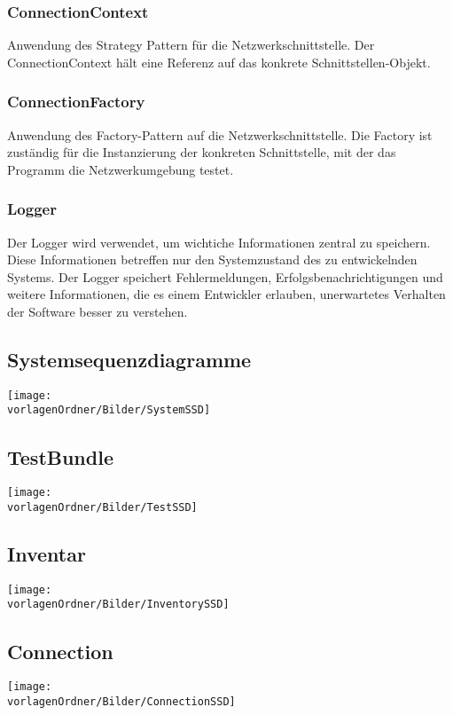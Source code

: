 \documentclass[
	ngerman,
	toc=listof, %
	toc=bibliography, %
	footnotes=multiple, %
	parskip=half, %
	numbers=noendperiod %
]{scrartcl}
\newcommand{\vorlagenOrdner}{../../99_Vorlagen} %
\begin{document}
	\subsubsection{ConnectionContext}
	Anwendung des Strategy Pattern für die Netzwerkschnittstelle. 
	Der ConnectionContext hält eine Referenz auf das konkrete Schnittstellen-Objekt.

	\subsubsection{ConnectionFactory}
	Anwendung des Factory-Pattern auf die Netzwerkschnittstelle.
	Die Factory ist zuständig für die Instanzierung der konkreten Schnittstelle, mit der das Programm die Netzwerkumgebung testet.

	\subsubsection{Logger}
	Der Logger wird verwendet, um wichtiche Informationen zentral zu speichern. 
	Diese Informationen betreffen nur den Systemzustand des zu entwickelnden Systems.
	Der Logger speichert Fehlermeldungen, Erfolgsbenachrichtigungen und weitere Informationen, die es einem Entwickler erlauben, unerwartetes Verhalten der Software besser zu verstehen.

\begin{landscape}
	\section{Systemsequenzdiagramme}
		\texttt{[image: \\vorlagenOrdner/Bilder/SystemSSD]}
		\newpage
\end{landscape}
	
	\subsection{TestBundle}
		\texttt{[image: \\vorlagenOrdner/Bilder/TestSSD]}
	
	\subsection{Inventar}
		\texttt{[image: \\vorlagenOrdner/Bilder/InventorySSD]}

	\subsection{Connection}
		\texttt{[image: \\vorlagenOrdner/Bilder/ConnectionSSD]}
\end{document}
